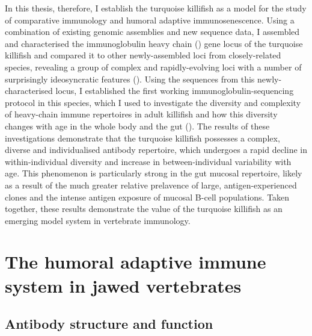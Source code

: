 In this thesis, therefore, I establish the turquoise killifish as a model for the study of comparative immunology and humoral adaptive immunosenescence. Using a combination of existing genomic assemblies and new sequence data, I assembled and characterised the immunoglobulin heavy chain (\igh{}) gene locus of the turquoise killifish and compared it to other newly-assembled loci from closely-related species, revealing a group of complex and rapidly-evolving loci with a number of surprisingly ideosyncratic features (). Using the sequences from this newly-characterised locus, I established the first working immunoglobulin-sequencing protocol in this species, which I used to investigate the diversity and complexity of heavy-chain immune repertoires in adult killifish and how this diversity changes with age in the whole body and the gut (). The results of these investigations demonstrate that the turquoise killifish possesses a complex, diverse and individualised antibody repertoire, which undergoes a rapid decline in within-individual diversity and increase in between-individual variability with age. This phenomenon is particularly strong in the gut mucosal repertoire, likely as a result of the much greater relative prelavence of large, antigen-experienced clones and the intense antigen exposure of mucosal B-cell populations. Taken together, these results demonstrate the value of the turquoise killifish as an emerging model system in vertebrate immunology. %

\section{The humoral adaptive immune system in jawed vertebrates}
\label{sec:intro_antibodies}

\subsection{Antibody structure and function}
\label{sec:intro_antibody_structure}

